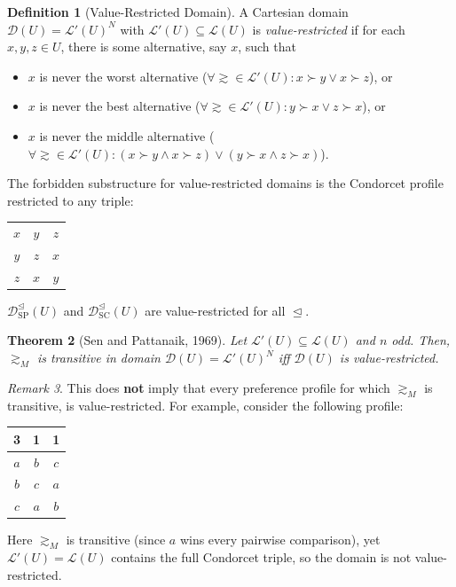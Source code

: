 \documentclass{book}
\theoremstyle{plain}
\newtheorem{theorem}{Theorem}[subsection]
\theoremstyle{definition}
\newtheorem{definition}[theorem]{Definition}
\theoremstyle{remark}
\newtheorem{remark}[theorem]{Remark}
\begin{document}
\begin{definition}[Value-Restricted Domain]
    A Cartesian domain $\mathcal{D}(U) = \mathcal{L}'(U)^N$ with 
    $\mathcal{L}'(U) \subseteq \mathcal{L}(U)$ is 
    \emph{value-restricted} if for each $x, y, z \in U$, 
    there is some alternative, say $x$, such that
    \begin{itemize}
        \item $x$ is never the worst alternative 
        ($\forall \gtrsim \in \mathcal{L}'(U): x \succ y \lor x \succ z$), or
        \item $x$ is never the best alternative 
        ($\forall \gtrsim \in \mathcal{L}'(U): y \succ x \lor z \succ x$), or
        \item $x$ is never the middle alternative 
        ($\forall \gtrsim \in \mathcal{L}'(U): (x \succ y \land x \succ z) \lor (y \succ x \land z \succ x)$).
    \end{itemize}

    The forbidden substructure for value-restricted domains is 
    the Condorcet profile restricted to any triple:
    \begin{center}
    \begin{tabular}{ccc}
        $x$ & $y$ & $z$ \\
        $y$ & $z$ & $x$ \\
        $z$ & $x$ & $y$
    \end{tabular}
    \end{center}

    $\mathcal{D}_{\text{SP}}^{\trianglelefteq}(U)$ and 
    $\mathcal{D}_{\text{SC}}^{\trianglelefteq}(U)$ are value-restricted 
    for all $\trianglelefteq$.
\end{definition}

\begin{theorem}[Sen and Pattanaik, 1969]
    Let $\mathcal{L}'(U) \subseteq \mathcal{L}(U)$ and $n$ odd.
    Then, $\gtrsim_M$ is transitive in domain 
    $\mathcal{D}(U) = \mathcal{L}'(U)^N$ iff $\mathcal{D}(U)$ is value-restricted.
\end{theorem}

\begin{remark}
    This does \textbf{not} imply that every preference profile 
    for which $\gtrsim_M$ is transitive, is value-restricted.
    For example, consider the following profile:
    \begin{center}
    \begin{tabular}{|c|c|c|}
        \hline
        \textbf{3} & \textbf{1} & \textbf{1} \\
        \hline
        $a$ & $b$ & $c$ \\
        $b$ & $c$ & $a$ \\
        $c$ & $a$ & $b$ \\
        \hline
    \end{tabular}
    \end{center}
    Here $\gtrsim_M$ is transitive (since $a$ wins every pairwise comparison),
    yet $\mathcal{L}'(U) = \mathcal{L}(U)$ contains the full Condorcet triple,
    so the domain is not value-restricted.
\end{remark}
\end{document}
